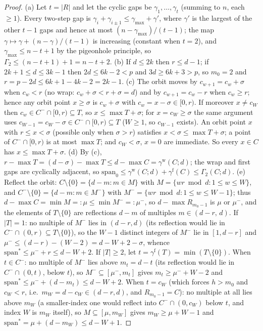 \begin{proof}
(a) Let $t=|R|$ and let the cyclic gaps be $\gamma_1,\dots,\gamma_t$
(summing to $n$, each $\ge1$). Every two-step gap is
$\gamma_i+\gamma_{i\pm1}\le\gamma_{\max}+\gamma'$, where $\gamma'$ is
the largest of the other $t-1$ gaps and hence at most
$(n-\gamma_{\max})/(t-1)$; the map $\gamma\mapsto\gamma+(n-\gamma)/(t-1)$
is increasing (constant when $t=2$), and
$\gamma_{\max}\le n-t+1$ by the pigeonhole principle, so
$\Gamma_2\le(n-t+1)+1=n-t+2$.
(b) If $d\le2k$ then $r\le d-1$; if $2k+1\le d\le3k-1$ then
$2d\le6k-2<p$ and $3d\ge6k+3>p$, so $m_0=2$ and
$r=p-2d\le6k+1-4k-2=2k-1$.
(c) The orbit moves by $c_{w+1}=c_w+\sigma$ when $c_w<r$ (no wrap:
$c_w+\sigma<r+\sigma=d$) and by $c_{w+1}=c_w-r$ when $c_w\ge r$; hence
any orbit point $x\ge\sigma$ is $c_w+\sigma$ with $c_w=x-\sigma\in[0,r)$.
If moreover $x\ne c_W$ then $c_w\in C^-\cap[0,r)\subseteq T$, so
$x\le\max T+\sigma$; for $x=c_W\ge\sigma$ the same argument uses
$c_{W-1}=c_W-\sigma\in C^-\cap[0,r)\subseteq T$ ($W\ge1$, so $c_{W-1}$
exists). An orbit point $x$ with $r\le x<\sigma$ (possible only when
$\sigma>r$) satisfies $x<\sigma\le\max T+\sigma$; a point of
$C^-\cap[0,r)$ is at most $\max T$; and $c_W<\sigma$, $x=0$ are
immediate. So every $x\in C$ has $x\le\max T+\sigma$.
(d) By (c), $r-\max T=(d-\sigma)-\max T\le d-\max
C=\gamma^{\mathrm w}(C;d)$; the wrap and first gaps are cyclically
adjacent, so $\mathrm{span}_0\le\gamma^{\mathrm w}(C;d)+\gamma^{\mathrm
f}(C)\le\Gamma_2(C;d)$.
(e) Reflect the orbit: $C\setminus\{0\}=\{d-m:m\in M\}$ with
$M=\{wr\bmod d:1\le w\le W\}$, and $C^-\setminus\{0\}=\{d-m:m\in M^-\}$
with $M^-=\{wr\bmod d:1\le w\le W-1\}$; thus $d-\max C=\min M=:\mu\le
\min M^-=:\mu^-$, so $d-\max R_{m_0-1}$ is $\mu$ or $\mu^-$, and the
elements of $T\setminus\{0\}$ are reflections $d-m$ of multiples
$m\in(d-r,\,d)$. If $|T|=1$: no multiple of $M^-$ lies in $(d-r,d)$
(its reflection would lie in $C^-\cap(0,r)\subseteq T\setminus\{0\}$),
so the $W-1$ distinct integers of $M^-$ lie in $[1,d-r]$ and
$\mu^-\le(d-r)-(W-2)=d-W+2-\sigma$, whence
$\mathrm{span}^\ast\le\mu^-+r\le d-W+2$. If $|T|\ge2$, let
$t=\gamma^{\mathrm f}(T)=\min(T\setminus\{0\})$. When $t\in C^-$: no
multiple of $M^-$ lies above $m_t=d-t$ (its reflection would lie in
$C^-\cap(0,t)$, below $t$), so $M^-\subseteq[\mu^-,m_t]$ gives
$m_t\ge\mu^-+W-2$ and
$\mathrm{span}^\ast\le\mu^-+(d-m_t)\le d-W+2$. When $t=c_W$ (which
forces $h>m_0$ and $c_W<r$, i.e.\ $m_W=d-c_W\in(d-r,d)$, and
$R_{m_0-1}=C$): no multiple at all lies above $m_W$ (a smaller-index
one would reflect into $C^-\cap(0,c_W)$ below $t$, and index $W$ is
$m_W$ itself), so $M\subseteq[\mu,m_W]$ gives $m_W\ge\mu+W-1$ and
$\mathrm{span}^\ast=\mu+(d-m_W)\le d-W+1$.
\end{proof}

